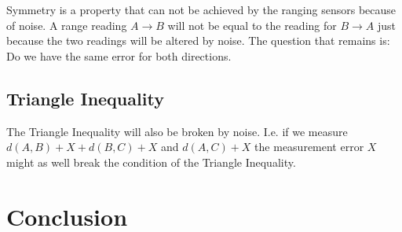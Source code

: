 Symmetry is a property that can not be achieved by the ranging sensors because of noise. 
A range reading $A \rightarrow B$ will not be equal to the reading for $B \rightarrow A$ just because the two readings will be altered by noise.
The question that remains is: Do we have the same error for both directions.



\subsection{Triangle Inequality}
The Triangle Inequality will also be broken by noise.
I.e. if we measure $d(A,B) + X + d(B,C) + X$ and $d(A, C) + X$ the measurement error $X$ might as well break the condition of the Triangle Inequality.


\section{Conclusion}

